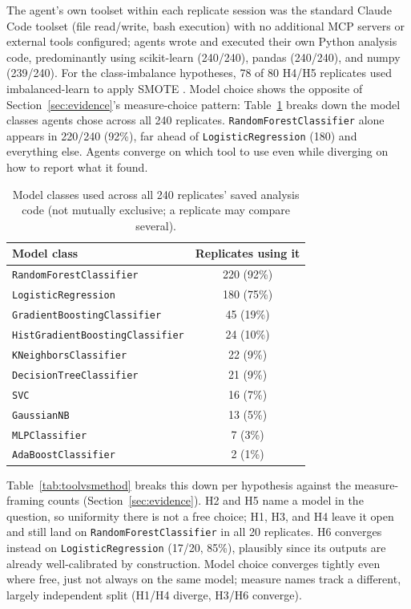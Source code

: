 \documentclass{article}
\begin{document}
The agent's own toolset within each replicate session was the standard Claude Code toolset
(file read/write, bash execution) with no additional MCP servers or external tools
configured; agents wrote and executed their own Python analysis code, predominantly using
scikit-learn \citep{pedregosa2011} (240/240), pandas \citep{mckinney2010} (240/240), and
numpy \citep{harris2020} (239/240). For the class-imbalance hypotheses, 78 of 80 H4/H5
replicates used imbalanced-learn \citep{lemaitre2017} to apply SMOTE \citep{chawla2002}.
Model choice shows the opposite of Section~\ref{sec:evidence}'s measure-choice pattern:
Table~\ref{tab:models} breaks down the model classes agents chose across all 240
replicates. \texttt{RandomForestClassifier} alone appears in 220/240 (92\%), far ahead of
\texttt{LogisticRegression} (180) and everything else. Agents converge on which tool to use
even while diverging on how to report what it found.

\begin{table}[h]
  \caption{Model classes used across all 240 replicates' saved analysis code (not mutually
  exclusive; a replicate may compare several).}
  \label{tab:models}
  \centering
  \footnotesize
  \renewcommand{\arraystretch}{0.72}
  \begin{tabular}{lc}
    \toprule
    Model class & Replicates using it \\
    \midrule
    \texttt{RandomForestClassifier} & 220 (92\%) \\
    \texttt{LogisticRegression} & 180 (75\%) \\
    \texttt{GradientBoostingClassifier} & 45 (19\%) \\
    \texttt{HistGradientBoostingClassifier} & 24 (10\%) \\
    \texttt{KNeighborsClassifier} & 22 (9\%) \\
    \texttt{DecisionTreeClassifier} & 21 (9\%) \\
    \texttt{SVC} & 16 (7\%) \\
    \texttt{GaussianNB} & 13 (5\%) \\
    \texttt{MLPClassifier} & 7 (3\%) \\
    \texttt{AdaBoostClassifier} & 2 (1\%) \\
    \bottomrule
  \end{tabular}
  \renewcommand{\arraystretch}{1}
\end{table}

Table~\ref{tab:toolvsmethod} breaks this down per hypothesis against the
measure-framing counts (Section~\ref{sec:evidence}). H2 and H5 name a model in the
question, so uniformity there is not a free choice; H1, H3, and H4 leave it open and
still land on \texttt{RandomForestClassifier} in all 20 replicates. H6 converges instead
on \texttt{LogisticRegression} (17/20, 85\%), plausibly since its outputs are already
well-calibrated by construction. Model choice converges tightly even where free, just not
always on the same model; measure names track a different, largely independent split
(H1/H4 diverge, H3/H6 converge).
\end{document}
